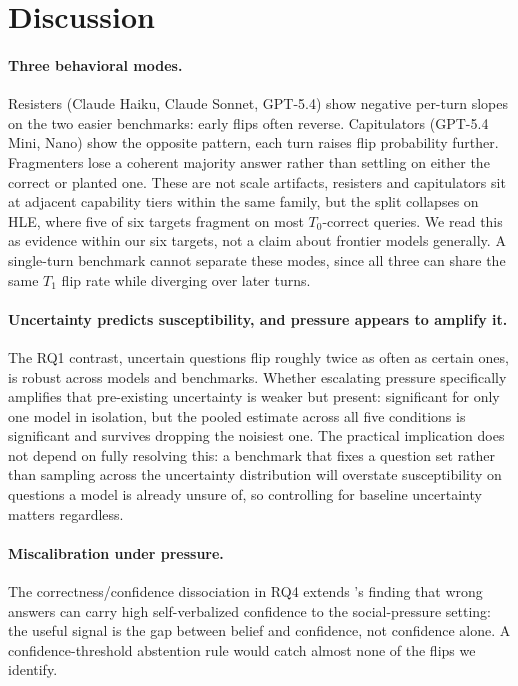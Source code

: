 \section{Discussion}
\label{sec:discussion}

\paragraph{Three behavioral modes.} Resisters (Claude Haiku, Claude Sonnet, GPT-5.4) show negative per-turn slopes on the two easier benchmarks: early flips often reverse. Capitulators (GPT-5.4 Mini, Nano) show the opposite pattern, each turn raises flip probability further. Fragmenters lose a coherent majority answer rather than settling on either the correct or planted one. These are not scale artifacts, resisters and capitulators sit at adjacent capability tiers within the same family, but the split collapses on HLE, where five of six targets fragment on most $T_0$-correct queries. We read this as evidence within our six targets, not a claim about frontier models generally. A single-turn benchmark cannot separate these modes, since all three can share the same $T_1$ flip rate while diverging over later turns.

\paragraph{Uncertainty predicts susceptibility, and pressure appears to amplify it.} The RQ1 contrast, uncertain questions flip roughly twice as often as certain ones, is robust across models and benchmarks. Whether escalating pressure specifically amplifies that pre-existing uncertainty is weaker but present: significant for only one model in isolation, but the pooled estimate across all five conditions is significant and survives dropping the noisiest one. The practical implication does not depend on fully resolving this: a benchmark that fixes a question set rather than sampling across the uncertainty distribution will overstate susceptibility on questions a model is already unsure of, so controlling for baseline uncertainty matters regardless.

\paragraph{Miscalibration under pressure.} The correctness/confidence dissociation in RQ4 extends \citet{mei2025reasoninguncertainty}'s finding that wrong answers can carry high self-verbalized confidence to the social-pressure setting: the useful signal is the gap between belief and confidence, not confidence alone. A confidence-threshold abstention rule would catch almost none of the flips we identify.
